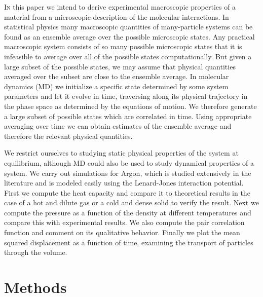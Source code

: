 \documentclass[twoside]{article}
\begin{document}
\lettrine[nindent=1em,lines=2]{I}
n this paper we intend to derive experimental macroscopic properties of a material from a microscopic description of the molecular interactions. In statistical physics many macroscopic quantities of many-particle systems can be found as an ensemble average over the possible microscopic states. Any practical macroscopic system consists of so many possible microscopic states that it is infeasible to average over all of the possible states computationally. But given a large subset of the possible states, we may assume that physical quantities averaged over the subset are close to the ensemble average. In molecular dynamics (MD) we initialize a specific state determined by some system parameters and let it evolve in time, traversing along its physical trajectory in the phase space as determined by the equations of motion. We therefore generate a large subset of possible states which are correlated in time. Using appropriate averaging over time we can obtain estimates of the ensemble average and therefore the relevant physical quantities.

We restrict ourselves to studying static physical properties of the system at equilibrium, although MD could also be used to study dynamical properties of a system. We carry out simulations for Argon, which is studied extensively in the literature and is modeled easily using the Lenard-Jones interaction potential. First we compute the heat capacity and compare it to theoretical results in the case of a hot and dilute gas or a cold and dense solid to verify the result. Next we compute the pressure as a function of the density at different temperatures and compare this with experimental results. We also compute the pair correlation function and comment on its qualitative behavior. Finally we plot the mean squared displacement as a function of time, examining the transport of particles through the volume.


\section{Methods}
\end{document}
